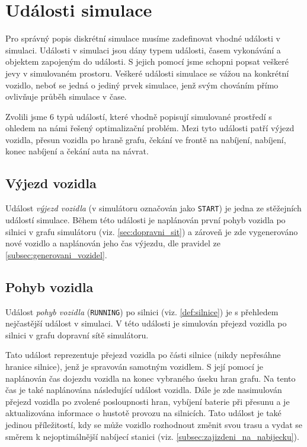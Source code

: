 \section{Události simulace}
Pro správný popis diskrétní simulace musíme zadefinovat vhodné události v simulaci.
Události v simulaci jsou dány typem události, časem vykonávání a objektem 
zapojeným do události. S jejich pomocí jsme schopni popsat veškeré jevy v 
simulovaném prostoru.
Veškeré události simulace se vážou na konkrétní vozidlo, neboť se jedná o 
jediný prvek simulace, jenž svým chováním přímo ovlivňuje průběh simulace
v čase.

Zvolili jsme 6 typů událostí, které vhodně popisují simulované prostředí s ohledem
na námi řešený optimalizační problém. Mezi tyto události patří výjezd vozidla,
přesun vozidla po hraně grafu, čekání ve frontě na nabíjení, nabíjení,
konec nabíjení a čekání auta na návrat.

\subsection{Výjezd vozidla}

Událost \emph{výjezd vozidla} (v simulátoru označován jako \texttt{START}) je 
jedna ze stěžejních událostí simulace. Během této události je naplánován 
první pohyb vozidla po silnici v grafu simulátoru (viz. \cref{sec:dopravni_sit})
a zároveň je zde vygenerováno nové vozidlo a naplánován jeho čas výjezdu, 
dle pravidel ze \cref{subsec:generovani_vozidel}.

\subsection{Pohyb vozidla}
\label{subsec:udalost_presunu}

Událost \emph{pohyb vozidla} (\texttt{RUNNING}) po silnici (viz. \cref{def:silnice})
je s přehledem nejčastější událost v simulaci. V této události je simulován 
přejezd vozidla po silnici v grafu dopravní sítě simulátoru.

Tato událost reprezentuje přejezd vozidla po části silnice (nikdy nepřesáhne hranice 
silnice), jenž je spravován samotným vozidlem. S její pomocí je naplánován 
čas dojezdu vozidla na konec vybraného úseku hran grafu. Na tento čas je také
naplánována následující událost vozidla. Dále je zde nasimulován přejezd vozidla
po zvolené posloupnosti hran, vybíjení baterie při přesunu a
je aktualizována informace o hustotě provozu na silnicích.
Tato událost je také jedinou příležitostí, kdy se může vozidlo rozhodnout
změnit svou trasu a vydat se směrem k nejoptimálnější nabíjecí stanici 
(viz. \cref{subsec:zajizdeni_na_nabijecku}).

